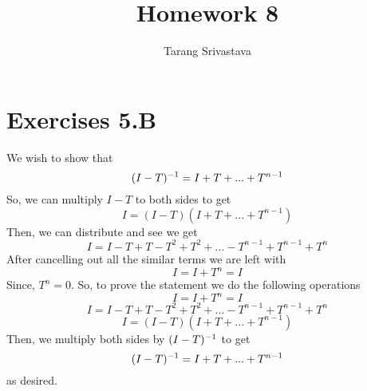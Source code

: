 \documentclass[10pt, twocolumn]{article}
\title{Homework 8}
\author{Tarang Srivastava}
\begin{document}
\makechaptertitle

\section{Exercises 5.B}
\begin{q}[1]
    We wish to show that 
    $$ (I - T)^{-1} = I + T + ... + T^{n - 1} $$
    So, we can multiply $ I - T $ to both sides to get 
    $$ I = (I - T)(I + T + ... + T^{n - 1}) $$
    Then, we can distribute and see we get 
    $$ I = I - T + T - T^2 + T^2 + ... - T^{n-1}  + T^{n-1} + T^{n} $$
    After cancelling out all the similar terms we are left with
    $$ I = I + T^{n} = I $$
    Since, $ T^n = 0 $. 
    So, to prove the statement we do the following operations
    $$ I = I + T^{n} = I $$
    $$ I = I - T + T - T^2 + T^2 + ... - T^{n-1}  + T^{n-1} + T^{n} $$
    $$ I = (I - T)(I + T + ... + T^{n - 1}) $$
    Then, we multiply both sides by $ (I - T)^{-1} $ to get 
    $$ (I - T)^{-1} = I + T + ... + T^{n - 1} $$
    as desired.
\end{q}
\end{document}
